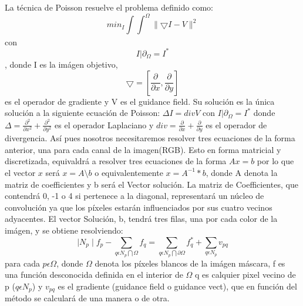 \documentclass[oneside]{article}
\begin{document}
\begin{multicols}{1}
La técnica de Poisson resuelve el problema definido como: \[min_{I}\int \int_{}^{\Omega } \parallel \bigtriangledown I-V\parallel^{2}\] con \[I|\partial_{\Omega}=I^{*}\], donde
I es la imágen objetivo, \[\bigtriangledown =\left [\frac{\partial }{\partial x},\frac{\partial }{\partial y} \right ]\]
es el operador de gradiente y V es el guidance field. Su solución es la única solución a la siguiente ecuación de Poisson: \newline
$\Delta I=div V$ con $I|\partial_{\Omega}=I^{*}$ donde $\Delta=\frac{\partial^2 }{\partial x^2}+\frac{\partial^2 }{\partial y^2}$ es el operador
Laplaciano y $div=\frac{\partial }{\partial x}+\frac{\partial }{\partial y}$ es el operador de divergencia. \newline
Así pues nosotros necesitaremos resolver tres ecuaciones de la forma anterior, una para cada canal de la imagen(RGB). \newline
Esto en forma matricial y discretizada, equivaldrá a resolver tres ecuaciones de la forma $Ax=b$ por lo que el vector $x$ será $x=A\setminus b$ o equivalentemente $x=A ^{-1}*b$, donde A denota la matriz de coefficientes y b será el Vector solución. \newline
La matriz de Coefficientes, que contendrá 0, -1 o 4 si pertenece a la diagonal, representará un núcleo de convolución ya que los píxeles estarán influenciados
por sus cuatro vecinos adyacentes. \newline
El vector Solución, b, tendrá tres filas, una por cada color de la imágen, y se obtiene resolviendo:
\[\mid N_{p} \mid f_{p}-\sum_{q\epsilon N_{p}\bigcap \Omega} f_{q}=\sum_{q\epsilon N_{p}\bigcap \partial\Omega}f^{*}_{q}+\sum_{q\epsilon N_{p}}v_{pq}\]
para cada $ p \epsilon \Omega$, donde $\Omega$ denota los píxeles blancos de la imágen máscara, f es una función desconocida definida en el interior de $\Omega$
q es calquier pixel vecino de p ($q \epsilon N_{p}$) y $v_{pq}$ es el gradiente (guidance field o guidance vect), que en función del método
se calculará de una manera o de otra. \newline


\end{multicols}
\end{document}
